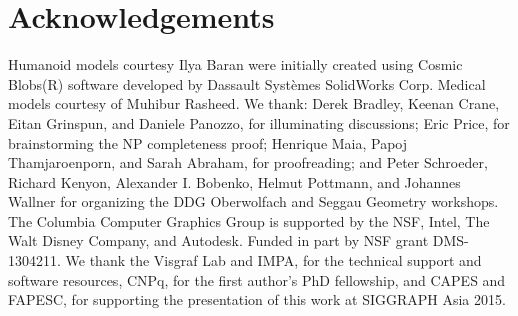 \section*{Acknowledgements}
%
Humanoid models courtesy Ilya Baran were initially created using Cosmic
Blobs(R) software developed by Dassault Syst\`{e}mes SolidWorks Corp. Medical
models courtesy of Muhibur Rasheed.
%
We thank: Derek Bradley, Keenan Crane, Eitan Grinspun, and Daniele Panozzo, for
illuminating discussions;
%
Eric Price, for brainstorming the NP completeness proof;
%
Henrique Maia, Papoj Thamjaroenporn, and Sarah Abraham, for proofreading; and
Peter Schroeder, Richard Kenyon, Alexander I. Bobenko, Helmut Pottmann, and
Johannes Wallner for organizing the DDG Oberwolfach and Seggau Geometry
workshops.
%
The Columbia Computer Graphics Group is supported by the NSF, Intel, The Walt
Disney Company, and Autodesk.
%
Funded in part by NSF grant DMS-1304211.
%
We thank the Visgraf Lab and IMPA, for the technical support and software resources, CNPq, for the first author's PhD fellowship, and CAPES and FAPESC, for supporting the presentation of this work at SIGGRAPH Asia 2015.
